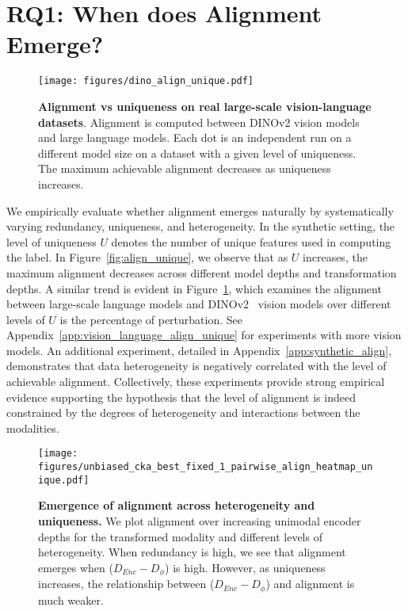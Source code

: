 
\section{RQ1: When does Alignment Emerge?}\label{sec:align_emerge}

\begin{figure}[t!]
\centering
\texttt{[image: figures/dino\_align\_unique.pdf]}
\vspace{-1em}\caption{\textbf{Alignment vs uniqueness on real large-scale vision-language datasets}. Alignment is computed between DINOv2 vision models and large language models. Each dot is an independent run on a different model size on a dataset with a given level of uniqueness. The maximum achievable alignment decreases as uniqueness increases.}
\label{fig:real model alignments}
\end{figure}

We empirically evaluate whether alignment emerges naturally by systematically varying redundancy, uniqueness, and heterogeneity. In the synthetic setting, the level of uniqueness $U$ denotes the number of unique features used in computing the label. In Figure~\ref{fig:align_unique}, we observe that as $U$ increases, the maximum alignment decreases across different model depths and transformation depths. A similar trend is evident in Figure~\ref{fig:real model alignments}, which examines the alignment between large-scale language models and DINOv2~\citep{oquab_dinov2_2023} vision models over different levels of $U$ is the percentage of perturbation. See Appendix~\ref{app:vision_language_align_unique} for experiments with more vision models. An additional experiment, detailed in Appendix~\ref{app:synthetic_align}, demonstrates that data heterogeneity is negatively correlated with the level of achievable alignment. Collectively, these experiments provide strong empirical evidence supporting the hypothesis that the level of alignment is indeed constrained by the degrees of heterogeneity and interactions between the modalities.

\begin{figure*}[t!]
    \centering
    \texttt{[image: figures/unbiased\_cka\_best\_fixed\_1\_pairwise\_align\_heatmap\_unique.pdf]}
    \vspace{-2em}
    \caption{\textbf{Emergence of alignment across heterogeneity and uniqueness.} We plot alignment over increasing unimodal encoder depths for the transformed modality and different levels of heterogeneity. When redundancy is high, we see that alignment emerges when (\(D_{Enc} - D_{\phi}\)) is high. However, as uniqueness increases, the relationship between (\(D_{Enc} - D_{\phi}\)) and alignment is much weaker.}
    \label{fig:align_heatmap}
    \vspace{-1em}
\end{figure*}

